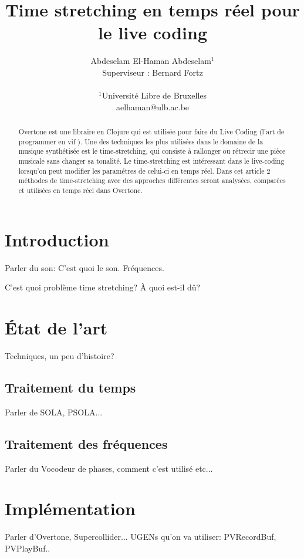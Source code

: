 \documentclass[letterpaper]{article}
\title{Time stretching en temps réel pour le live coding}
\author{Abdeselam El-Haman Abdeselam$^{1}$\\
Superviseur : Bernard Fortz
\mbox{}\\\\
$^1$Université Libre de Bruxelles \\
aelhaman@ulb.ac.be}
\begin{document}
\maketitle

\begin{abstract}
  Overtone est une libraire en Clojure qui est utilisée pour faire du
  Live Coding (l'art de programmer en \og vif \fg{}). Une des techniques les
  plus utilisées dans le domaine de la musique synthétisée est le
  time-stretching, qui consiste à rallonger ou rétrecir une pièce musicale
  sans changer sa tonalité. Le time-stretching est intéressant dans
  le live-coding lorsqu'on peut modifier les paramétres de celui-ci
  en temps réel. Dans cet article 2 méthodes de time-stretching avec des
  approches différentes seront analysées, comparées et utilisées en temps
  réel dans Overtone.

\end{abstract}

\section{Introduction}
Parler du son: C'est quoi le son. Fréquences.

C'est quoi problème time stretching?
À quoi est-il dû?

\section{État de l'art}
Techniques, un peu d'histoire?

\subsection{Traitement du temps}
Parler de SOLA, PSOLA...
\subsection{Traitement des fréquences}
Parler du Vocodeur de phases, comment c'est utilisé etc...
\section{Implémentation}
Parler d'Overtone, Supercollider...
UGENs qu'on va utiliser: PVRecordBuf, PVPlayBuf..


\footnotesize


\end{document}
